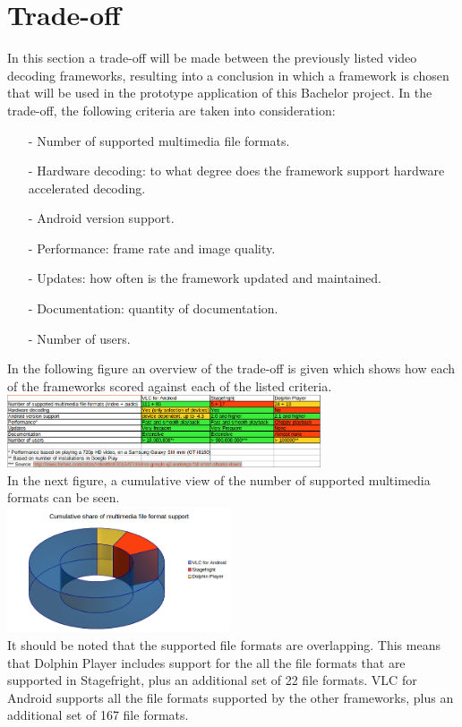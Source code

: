 \section{Trade-off}
In this section a trade-off will be made between the previously listed video decoding frameworks, resulting into a conclusion in which a framework is chosen that will be used in the prototype application of this Bachelor project. In the trade-off, the following criteria are taken into consideration:
\begin{itemize}
	\item[-]Number of supported multimedia file formats.
	\item[-]Hardware decoding: to what degree does the framework support hardware accelerated decoding. 
	\item[-]Android version support.
	\item[-]Performance: frame rate and image quality.
	\item[-]Updates: how often is the framework updated and maintained.
	\item[-]Documentation: quantity of documentation. 
	\item[-]Number of users.
\end{itemize}
In the following figure an overview of the trade-off is given which shows how each of the frameworks scored against each of the listed criteria.\\
\newline
\includegraphics[width=350px]{video_decoding/tradeoff.png}\\
\newline
In the next figure, a cumulative view of the number of supported multimedia formats can be seen.\\
\newline
\includegraphics[width=250px]{video_decoding/cumulativeshare.png}\\
\newline
It should be noted that the supported file formats are overlapping. This means that Dolphin Player includes support for the all the file formats that are supported in Stagefright, plus an additional set of 22 file formats. VLC for Android supports all the file formats supported by the other frameworks, plus an additional set of 167 file formats.\\




